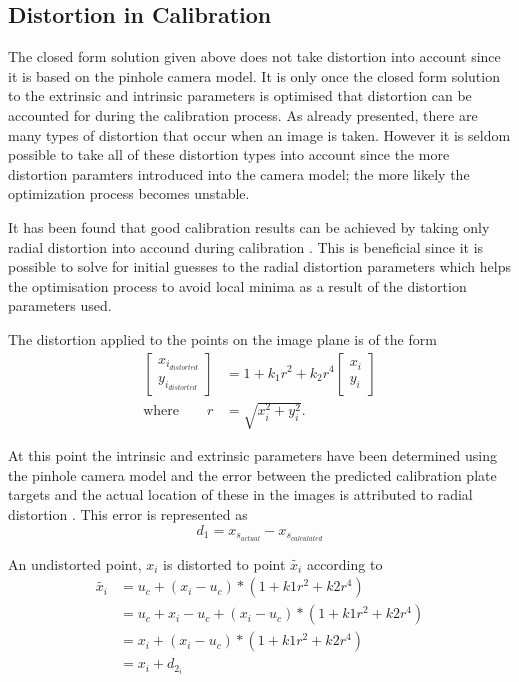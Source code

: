 \subsection{Distortion in Calibration}
The closed form solution given above does not take distortion into account since it is based on the pinhole camera model. It is only once the closed form solution to the extrinsic and intrinsic parameters is optimised that distortion can be accounted for during the calibration process. As already presented, there are many types of distortion that occur when an image is taken. However it is seldom possible to take all of these distortion types into account since the more distortion paramters introduced into the camera model; the more likely the optimization process becomes unstable.

It has been found  that good calibration results can be achieved by taking only radial distortion into accound during calibration \cite{tsai1987versatile,wei1994implicit}. This is beneficial since it is possible to solve for initial guesses to the radial distortion parameters which helps the optimisation process to avoid local minima as a result of the distortion parameters used.

The distortion applied to the points on the image plane is of the form
\begin{align}
	\begin{bmatrix}
	x_{i_{distorted}} \\
	y_{i_{distorted}}
	\end{bmatrix} &=
	1 + k_1 r^2 + k_2 r^4
	\begin{bmatrix}
	x_i \\
	y_i
	\end{bmatrix}\\
	\text{where} \quad \quad r &= \sqrt{x_i^2 + y_i^2}.
\end{align}

At this point the intrinsic and extrinsic parameters have been determined using the pinhole camera model and the error between the predicted calibration plate targets and the actual location of these in the images is attributed to radial distortion \cite{zhangtut}. This error is represented as
\begin{equation}
	d_1 = x_{s_{actual}} - x_{s_{calculated}}
\end{equation}

An undistorted point, $x_i$ is distorted to point $\tilde{x_i}$ according to
\begin{align}
	\tilde{x_i} &= u_c + (x_i-u_c)*(1 + k1 r^2 + k2 r^4) \\
	&= u_c + x_i - u_c + (x_i-u_c)*(1 + k1 r^2 + k2 r^4) \\
	&= x_i + (x_i-u_c)*(1 + k1 r^2 + k2 r^4) \\
	&= x_i + d_{2_i}
\end{align}


